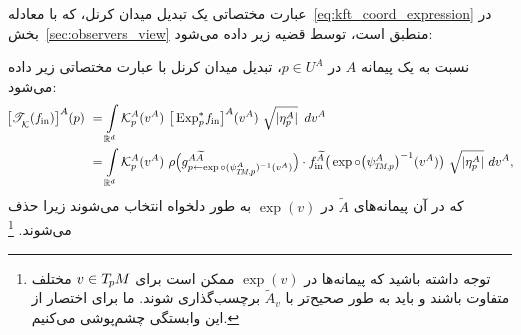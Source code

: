 عبارت مختصاتی یک تبدیل میدان کرنل، که با معادله~\eqref{eq:kft_coord_expression} در بخش~\ref{sec:observers_view} منطبق است، توسط قضیه زیر داده می‌شود:
\begin{thm}
\label{thm:kernel_field_trafo_in_coords}
    نسبت به یک پیمانه $A$ در $p\in U^A$، تبدیل میدان کرنل با عبارت مختصاتی زیر داده می‌شود:
    \begin{align}\label{eq:kernel_field_trafo_in_coords}
        \!\big[ \TK(\fin) \big]^A (p)
        \ &=
        \int\limits_{\R^d}
        \Kp^A (v^A) \ 
        \big[\Expspfin\big]^A (v^A)
        \ \sqrt{|\eta_p^A|}\,\ dv^A
        \notag \\
        \ &=
        \int\limits_{\R^d}
        \Kp^A (v^A) \ 
        \rho\pig( g^{A\widetilde{A}}_{p\leftarrow\exp\circ (\psiTMp^A)^{-1}(v^A)} \pig)
         \cdot \fin^{\widetilde{A}} \big( \exp \circ \big(\psiTMp^A\big)^{-1} (v^A) \big)
        \ \sqrt{|\eta_p^A|}\ dv^A ,\!
    \end{align}
    که در آن پیمانه‌های $\widetilde{A}$ در $\exp(v)$ به طور دلخواه انتخاب می‌شوند زیرا حذف می‌شوند.%
    \footnote{
        توجه داشته باشید که پیمانه‌ها در $\exp(v)$ ممکن است برای $v\in T_{\mkern-1.5mu p}\mkern-.5muM$ مختلف متفاوت باشند و باید به طور صحیح‌تر با $\widetilde{A}_v$ برچسب‌گذاری شوند.
        ما برای اختصار از این وابستگی چشم‌پوشی می‌کنیم.
    }
\end{thm}
